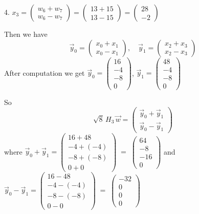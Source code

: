 \documentclass[lang=cn,11pt]{elegantbook}
\begin{document}
\begin{solution}
4. \(x_3 = \begin{pmatrix} w_6 + w_7 \\ w_6 - w_7 \end{pmatrix}
= \begin{pmatrix}13 + 15 \\ 13 - 15\end{pmatrix}
= \begin{pmatrix}28 \\ -2\end{pmatrix}\)

Then we have
\[
\vec{y}_0
=
\begin{pmatrix}
x_0 + x_1 \\
x_0 - x_1
\end{pmatrix},
\quad
\vec{y}_1
=
\begin{pmatrix}
x_2 + x_3 \\
x_2 - x_3
\end{pmatrix}
\]
After computation we get \(
    \vec{y}_0
    =
    \begin{pmatrix}
      16\\
      -4\\
      -8\\
      0
    \end{pmatrix}
  \),  \(
    \vec{y}_1
    =
    \begin{pmatrix}
      48\\
      -4\\
      -8\\
      0
    \end{pmatrix}
  \)

So
\[
\sqrt{8}\,H_3\,\vec{w}
=
\begin{pmatrix}
\vec{y}_0 + \vec{y}_1 \\
\vec{y}_0 - \vec{y}_1
\end{pmatrix}
\]
where
   \(\vec{y}_0 + \vec{y}_1 = 
     \begin{pmatrix}
     16 + 48\\
     -4 + (-4)\\
     -8 + (-8)\\
     0 + 0
     \end{pmatrix}
     \;=\;
     \begin{pmatrix}
     64\\
     -8\\
     -16\\
     0
     \end{pmatrix}
   \) and    \(\vec{y}_0 - \vec{y}_1 = 
     \begin{pmatrix}
     16 - 48\\
     -4 - (-4)\\
     -8 - (-8)\\
     0 - 0
     \end{pmatrix}
     \;=\;
     \begin{pmatrix}
     -32\\
     0\\
     0\\
     0
     \end{pmatrix}
   \)


\end{solution}
\end{document}

